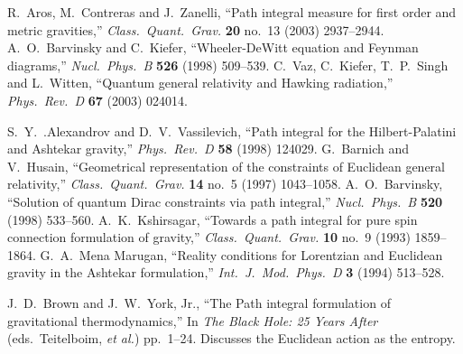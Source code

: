 \begin{thebibliography}{99}
  R.~Aros, M.~Contreras and J.~Zanelli,\newblock
  ``Path integral measure for first order and metric gravities,''\newblock
  \emph{Class.\ Quant.\ Grav.} {\bf 20} no.~13 (2003) 2937--2944\newblock
  [\arXiv{gr-qc/0303113}].
  A.~O.~Barvinsky and C.~Kiefer,\newblock
  ``Wheeler-DeWitt equation and Feynman diagrams,''\newblock
  \emph{Nucl.\ Phys.\ B} {\bf 526} (1998) 509--539\newblock
  [\arXiv{gr-qc/9711037}].
  C.~Vaz, C.~Kiefer, T.~P.~Singh and L.~Witten,\newblock
  ``Quantum general relativity and Hawking radiation,''\newblock
  \emph{Phys.\ Rev.\ D} {\bf 67} (2003) 024014\newblock
  [\arXiv{gr-qc/0208083}].

  S.~Y.~.Alexandrov and D.~V.~Vassilevich,\newblock
  ``Path integral for the Hilbert-Palatini and Ashtekar gravity,''\newblock
  \emph{Phys.\ Rev.\ D} {\bf 58} (1998) 124029\newblock
  [\arXiv{gr-qc/9806001}].
  G.~Barnich and V.~Husain,\newblock
  ``Geometrical representation of the constraints of Euclidean general relativity,''\newblock
  \emph{Class.\ Quant.\ Grav.} {\bf 14} no.~5 (1997) 1043--1058\newblock
  [\arXiv{gr-qc/9611030}].
  A.~O.~Barvinsky,\newblock
  ``Solution of quantum Dirac constraints via path integral,''\newblock
  \emph{Nucl.\ Phys.\ B} {\bf 520} (1998) 533--560.
  A.~K.~Kshirsagar,\newblock
  ``Towards a path integral for pure spin connection formulation of gravity,''\newblock
  \emph{Class.\ Quant.\ Grav.} {\bf 10} no.~9 (1993) 1859--1864.
  G.~A.~Mena Marugan,\newblock
  ``Reality conditions for Lorentzian and Euclidean gravity in the Ashtekar formulation,''\newblock
  \emph{Int.\ J.\ Mod.\ Phys.\ D} {\bf 3} (1994) 513--528\newblock
  [\arXiv{gr-qc/9311020}].


  J.~D.~Brown and J.~W.~York, Jr.,\newblock
  ``The Path integral formulation of gravitational thermodynamics,''\newblock
  In \emph{The Black Hole: 25 Years After} (eds.~Teitelboim, \emph{et al.}) pp.~1--24\newblock
  [\arXiv{gr-qc/9405024}].\newblock
  Discusses the Euclidean action as the entropy.


\end{thebibliography}

